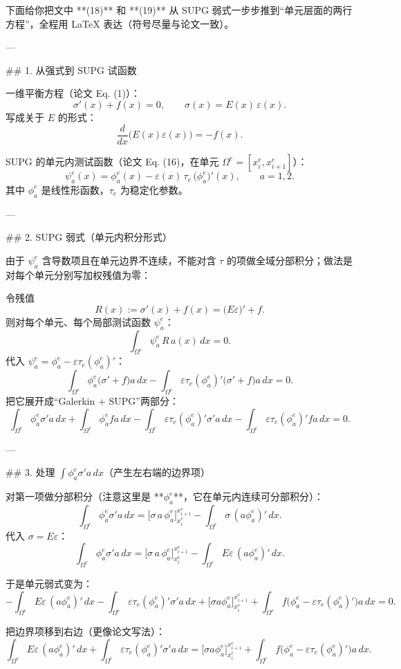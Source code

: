 下面给你把文中 **(18)** 和 **(19)** 从 SUPG 弱式一步步推到“单元层面的两行方程”，全程用 LaTeX 表达（符号尽量与论文一致）。

---

## 1. 从强式到 SUPG 试函数

一维平衡方程（论文 Eq. (1)）：
\[
\sigma'(x)+f(x)=0,\qquad \sigma(x)=E(x)\,\varepsilon(x).
\]
写成关于 \(E\) 的形式：
\[
\frac{d}{dx}\big(E(x)\varepsilon(x)\big)=-f(x).
\]

SUPG 的单元内测试函数（论文 Eq. (16)，在单元 \(\Omega^e=[x_i^e,x_{i+1}^e]\)）：
\[
\psi^{e}_a(x)=\phi^{e}_a(x)-\varepsilon(x)\,\tau_e\,\big(\phi^{e}_a\big)'(x),
\qquad a=1,2.
\]
其中 \(\phi_a^e\) 是线性形函数，\(\tau_e\) 为稳定化参数。

---

## 2. SUPG 弱式（单元内积分形式）

由于 \(\psi_a^e\) 含导数项且在单元边界不连续，不能对含 \(\tau\) 的项做全域分部积分；做法是对每个单元分别写加权残值为零：

令残值
\[
R(x):=\sigma'(x)+f(x)=\big(E\varepsilon\big)' + f .
\]
则对每个单元、每个局部测试函数 \(\psi_a^e\)：
\[
\int_{\Omega^e}\psi_a^e \,R \,a(x)\,dx=0.
\]
代入 \(\psi_a^e=\phi_a^e-\varepsilon\tau_e(\phi_a^e)'\)：
\[
\int_{\Omega^e}\phi_a^e\big(\sigma'+f\big)a\,dx
-\int_{\Omega^e}\varepsilon\tau_e(\phi_a^e)'\big(\sigma'+f\big)a\,dx=0.
\]
把它展开成“Galerkin + SUPG”两部分：
\[
\int_{\Omega^e}\phi_a^e \sigma' a\,dx
+\int_{\Omega^e}\phi_a^e f a\,dx
-\int_{\Omega^e}\varepsilon\tau_e(\phi_a^e)'\sigma' a\,dx
-\int_{\Omega^e}\varepsilon\tau_e(\phi_a^e)' f a\,dx=0.
\]

---

## 3. 处理 \(\int \phi_a^e \sigma' a\,dx\)（产生左右端的边界项）

对第一项做分部积分（注意这里是 **\(\phi_a^e\)**，它在单元内连续可分部积分）：
\[
\int_{\Omega^e}\phi_a^e \sigma' a\,dx
=
\Big[\sigma\,a\,\phi_a^e\Big]_{x_i^e}^{x_{i+1}^e}
-\int_{\Omega^e}\sigma\,(a\phi_a^e)'\,dx.
\]
代入 \(\sigma=E\varepsilon\)：
\[
\int_{\Omega^e}\phi_a^e \sigma' a\,dx
=
\Big[\sigma\,a\,\phi_a^e\Big]_{x_i^e}^{x_{i+1}^e}
-\int_{\Omega^e}E\varepsilon\,(a\phi_a^e)'\,dx.
\]

于是单元弱式变为：
\[
-\int_{\Omega^e}E\varepsilon\,(a\phi_a^e)'\,dx
-\int_{\Omega^e}\varepsilon\tau_e(\phi_a^e)'\sigma' a\,dx
+\Big[\sigma a\phi_a^e\Big]_{x_i^e}^{x_{i+1}^e}
+\int_{\Omega^e}f\Big(\phi_a^e-\varepsilon\tau_e(\phi_a^e)'\Big)a\,dx
=0.
\]

把边界项移到右边（更像论文写法）：
\[
\int_{\Omega^e}E\varepsilon\,(a\phi_a^e)'\,dx
+\int_{\Omega^e}\varepsilon\tau_e(\phi_a^e)'\sigma' a\,dx
=
\Big[\sigma a\phi_a^e\Big]_{x_i^e}^{x_{i+1}^e}
+\int_{\Omega^e}f\Big(\phi_a^e-\varepsilon\tau_e(\phi_a^e)'\Big)a\,dx.
\]

